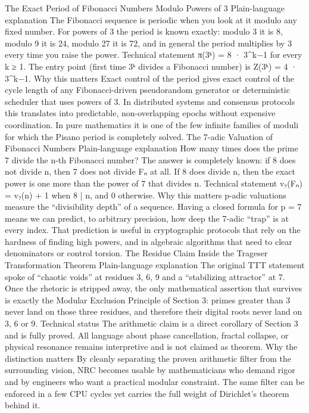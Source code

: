 {{{{{{The Exact Period of Fibonacci Numbers Modulo Powers of 3
Plain-language explanation
The Fibonacci sequence is periodic when you look at it modulo any fixed number. For powers of 3 the period is known exactly: modulo 3 it is 8, modulo 9 it is 24, modulo 27 it is 72, and in general the period multiplies by 3 every time you raise the power.
Technical statement
π(3ᵏ) = 8 · 3^{k−1} for every k ≥ 1.
The entry point (first time 3ᵏ divides a Fibonacci number) is Z(3ᵏ) = 4 · 3^{k−1}.
Why this matters
Exact control of the period gives exact control of the cycle length of any Fibonacci-driven pseudorandom generator or deterministic scheduler that uses powers of 3. In distributed systems and consensus protocols this translates into predictable, non-overlapping epochs without expensive coordination. In pure mathematics it is one of the few infinite families of moduli for which the Pisano period is completely solved.
The 7-adic Valuation of Fibonacci Numbers
Plain-language explanation
How many times does the prime 7 divide the n-th Fibonacci number? The answer is completely known: if 8 does not divide n, then 7 does not divide Fₙ at all. If 8 does divide n, then the exact power is one more than the power of 7 that divides n.
Technical statement
v₇(Fₙ) = v₇(n) + 1 when 8 | n, and 0 otherwise.
Why this matters
p-adic valuations measure the “divisibility depth” of a sequence. Having a closed formula for p = 7 means we can predict, to arbitrary precision, how deep the 7-adic “trap” is at every index. That prediction is useful in cryptographic protocols that rely on the hardness of finding high powers, and in algebraic algorithms that need to clear denominators or control torsion.
The Residue Claim Inside the Trageser Transformation Theorem
Plain-language explanation
The original TTT statement spoke of “chaotic voids” at residues 3, 6, 9 and a “stabilizing attractor” at 7. Once the rhetoric is stripped away, the only mathematical assertion that survives is exactly the Modular Exclusion Principle of Section 3: primes greater than 3 never land on those three residues, and therefore their digital roots never land on 3, 6 or 9.
Technical status
The arithmetic claim is a direct corollary of Section 3 and is fully proved. All language about phase cancellation, fractal collapse, or physical resonance remains interpretive and is not claimed as theorem.
Why the distinction matters
By cleanly separating the proven arithmetic filter from the surrounding vision, NRC becomes usable by mathematicians who demand rigor and by engineers who want a practical modular constraint. The same filter can be enforced in a few CPU cycles yet carries the full weight of Dirichlet’s theorem behind it.
}}}}}}
